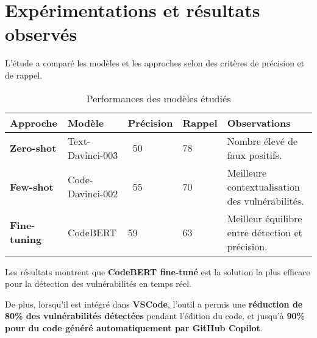 \label{ExpRO}\chapter{Expérimentations et résultats observés}

L’étude a comparé les modèles et les
approches selon des critères de précision et de rappel.

\begin{table}
        \centering
        \begin{tabular}{lllll}
            \toprule
            \textbf{Approche} & \textbf{Modèle} & \textbf{Précision} & \textbf{Rappel} & \textbf{Observations} \\
            \midrule

  \textbf{Zero-shot}


   &
  Text-Davinci-003


   &
  ~50%


   &
  78%


   &
  Nombre élevé de faux positifs.


   \\

  \textbf{Few-shot}


   &
  Code-Davinci-002


   &
  ~55%


   &
  70%


   &
  Meilleure contextualisation des
  vulnérabilités.


   \\

  \textbf{Fine-tuning}


   &
  CodeBERT


   &
  59%


   &
  63%


   &
  Meilleur équilibre entre détection et
  précision.


   \\
            \bottomrule
        \end{tabular}
        \caption{Performances des modèles étudiés}
        \label{tab:}
    \end{table}


Les résultats montrent que \textbf{CodeBERT
fine-tuné} est la solution la plus efficace pour la détection des
vulnérabilités en temps réel.



De plus, lorsqu’il est intégré dans \textbf{VSCode},
l’outil a permis une \textbf{réduction de 80\% des vulnérabilités détectées}
pendant l’édition du code, et jusqu’à \textbf{90\% pour du code généré
automatiquement par GitHub Copilot}.




